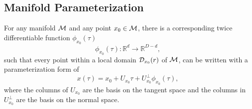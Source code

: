 \documentclass{article}
\theoremstyle{remark}
\begin{document}
\subsection{Manifold Parameterization}
For any manifold $\cal M$ and any point $x_0\in \cal M$, there is a corresponding twice differentiable function $\phi_{x_0}(\tau)$ 
\[
\phi_{x_0}(\tau):{\mathbb R}^d\rightarrow {\mathbb R}^{D-d},
\]
such that every point within a local domain ${\cal D}_{x_0}(r)$ of $\cal M$, can be written with a parameterization form of 
\begin{equation}\label{manifold}
x(\tau)=  x_0 + U_{x_0} \tau+ U_{x_0}^{\perp} \phi_{x_0} (\tau),
\end{equation}
where the columns of $U_{x_0}$ are the basis on the tangent space and the columns in $U_{x_0}^{\perp}$ are the basis on the normal space. 

%
\end{document}
